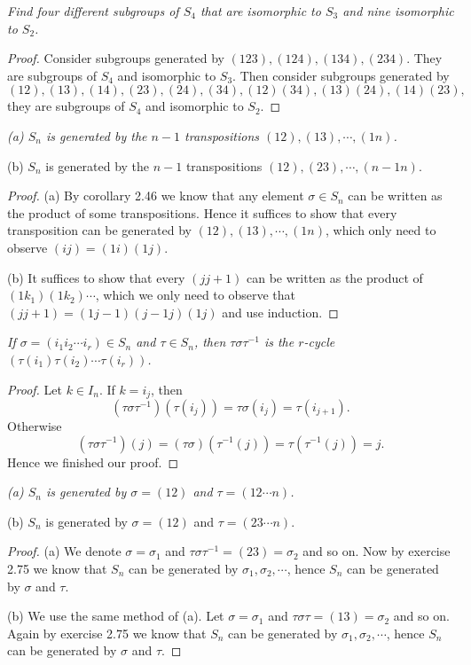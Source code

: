 \begin{problem}\em
Find four different subgroups of $S_4$ that are isomorphic to $S_3$ and nine isomorphic to $S_2$.
\end{problem}
\begin{proof}
Consider subgroups generated by $(123),(124),(134),(234)$. They are subgroups of $S_4$ and isomorphic to $S_3$. Then consider subgroups generated by 
$$(12),(13),(14),(23),(24),(34),(12)(34),(13)(24),(14)(23),$$ they are subgroups of $S_4$ and isomorphic to $S_2$.
\end{proof}
\begin{problem}\em
(a) $S_n$ is generated by the $n-1$ transpositions $(12),(13),\cdots,(1n)$.\par
(b) $S_n$ is generated by the $n-1$ transpositions $(12),(23),\cdots,(n-1 n)$.
\end{problem}
\begin{proof}
(a) By corollary 2.46 we know that any element $\sigma\in S_n$ can be written as the product of some transpositions. Hence it suffices to show that every transposition can be generated by $(12),(13),\cdots,(1n)$, which only need to observe $(ij)=(1i)(1j)$.\par
(b) It suffices to show that every $(j j+1)$ can be written as the product of $(1k_1)(1k_2)\cdots$, which we only need to observe that $(j j+1)=(1 j-1)(j-1 j)(1j)$ and use induction.
\end{proof}
\begin{problem}\em
If $\sigma=(i_1i_2\cdots i_r)\in S_n$ and $\tau\in S_n$, then $\tau\sigma\tau^{-1}$ is the $r$-cycle $(\tau(i_1)\tau(i_2)\cdots\tau(i_r))$.
\end{problem}
\begin{proof}
Let $k\in I_n$. If $k=i_j$, then 
$$
\left( \tau \sigma \tau ^{-1} \right) \left( \tau \left( i_j \right) \right) =\tau \sigma \left( i_j \right) =\tau \left( i_{j+1} \right) .
$$
Otherwise 
$$
\left( \tau \sigma \tau ^{-1} \right) \left( j \right) =\left( \tau \sigma \right) \left( \tau ^{-1}\left( j \right) \right) =\tau \left( \tau ^{-1}\left( j \right) \right) =j.
$$
Hence we finished our proof.
\end{proof}
\begin{problem}\em
(a) $S_n$ is generated by $\sigma=(12)$ and $\tau=(12\cdots n)$.\par
(b) $S_n$ is generated by $\sigma=(12)$ and $\tau=(23\cdots n)$.
\end{problem}
\begin{proof}
(a) We denote $\sigma=\sigma_1$ and $\tau\sigma\tau^{-1}=(23)=\sigma_2$ and so on. Now by exercise 2.75 we know that $S_n$ can be generated by $\sigma_1,\sigma_2,\cdots$, hence $S_n$ can be generated by $\sigma$ and $\tau$.\par
(b) We use the same method of (a). Let $\sigma=\sigma_1$ and $\tau\sigma\tau=(13)=\sigma_2$ and so on. Again by exercise 2.75 we know that $S_n$ can be generated by $\sigma_1,\sigma_2,\cdots$, hence $S_n$ can be generated by $\sigma$ and $\tau$.
\end{proof}
